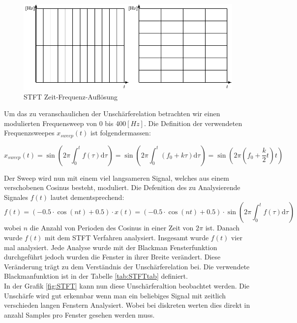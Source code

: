 \begin{figure}[!ht]
	\centering
	\includegraphics[width=0.7\linewidth]{papers/autotune/sections/fft/images/windows.pdf}
	\caption{STFT Zeit-Frequenz-Auflösung}\label{fig:stftauf}	
\end{figure}





 
Um das zu veranschaulichen  der Unschärferelation betrachten wir einen modulierten Frequensweep von 0 bis 400$[Hz]$. Die Definition der verwendeten Frequenzsweepes $x_{sweep}(t)$ ist folgendermassen:

\begin{equation}
x_{sweep}(t)=\sin \left(2 \pi \int_{0}^{t} f(\tau) \mathrm{d} \tau\right)=\sin \left(2 \pi \int_{0}^{t}\left(f_{0}+k \tau\right) \mathrm{d} \tau\right)=\sin \left(2 \pi\left(f_{0}+\frac{k}{2} t\right) t\right)
\end{equation} 

Der Sweep wird nun mit einem viel langsameren Signal, welches aus einem verschobenen Cosinus besteht, moduliert. Die Defenition des zu Analysierende Signales $f(t)$ lautet dementsprechend:
\begin{equation}
f(t)= (-0.5\cdot \cos(nt)+0.5)\cdot x(t)=(-0.5\cdot \cos(nt)+0.5)\cdot \sin \left(2 \pi \int_{0}^{t} f(\tau) \mathrm{d} \tau\right)
\end{equation} 
wobei $n$ die Anzahl von Perioden des Cosinus in einer Zeit von $2\pi$ ist. Danach wurde $f(t)$ mit dem STFT Verfahren analysiert. Insgesamt wurde $f(t)$ vier mal analysiert. Jede Analyse wurde mit der Blackman Fensterfunktion durchgeführt jedoch wurden die Fenster in ihrer Breite verändert. Diese Veränderung trägt zu dem Verständnis der Unschärferelation bei. Die verwendete Blackmanfunktion ist in der Tabelle \ref{tab:STFTtab} definiert.\\

In der Grafik \ref{fig:STFT} kann nun diese Unschärferaltion beobachtet werden. Die Unschärfe wird gut erkennbar wenn man ein beliebiges Signal mit zeitlich verschieden langen Fenstern Analysiert. Wobei bei diskreten werten dies direkt in anzahl Samples pro Fenster gesehen werden muss.\\



